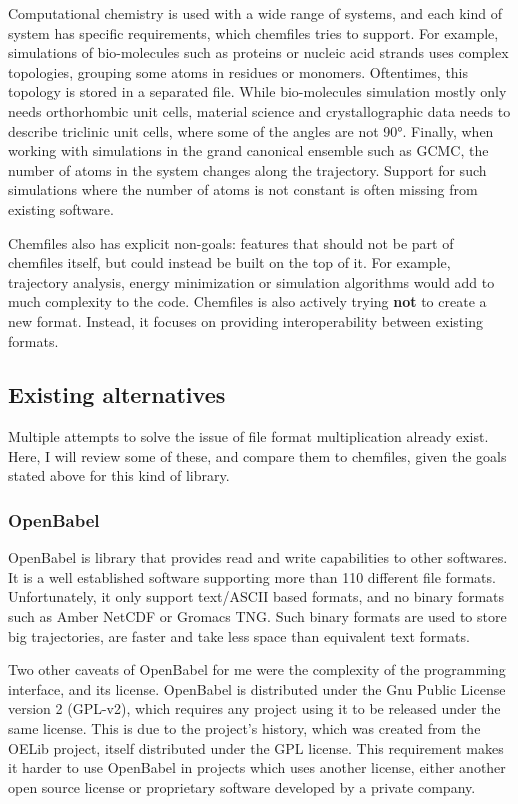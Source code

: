 \documentclass[thesis]{subfiles}
\begin{document}
Computational chemistry is used with a wide range of systems, and each kind of
system has specific requirements, which chemfiles tries to support. For
example, simulations of bio-molecules such as proteins or nucleic acid strands
uses complex topologies, grouping some atoms in residues or monomers.
Oftentimes, this topology is stored in a separated file. While bio-molecules
simulation mostly only needs orthorhombic unit cells, material science and
crystallographic data needs to describe triclinic unit cells, where some of the
angles are not 90°. Finally, when working with simulations in the grand
canonical ensemble such as GCMC, the number of atoms in the system changes along
the trajectory. Support for such simulations where the number of atoms is not
constant is often missing from existing software.

Chemfiles also has explicit non-goals: features that should not be part of
chemfiles itself, but could instead be built on the top of it. For example,
trajectory analysis, energy minimization or simulation algorithms would add to
much complexity to the code. Chemfiles is also actively trying \textbf{not} to
create a new format. Instead, it focuses on providing interoperability between
existing formats.

\subsection{Existing alternatives}

Multiple attempts to solve the issue of file format multiplication already
exist. Here, I will review some of these, and compare them to chemfiles,
given the goals stated above for this kind of library.

\subsubsection{OpenBabel}

OpenBabel\cite{OBoyle2011} is \cxx library that provides read and write
capabilities to other softwares. It is a well established software supporting
more than 110 different file formats. Unfortunately, it only support text/ASCII
based formats, and no binary formats such as Amber NetCDF or Gromacs TNG. Such
binary formats are used to store big trajectories, are faster and take less
space than equivalent text formats.

Two other caveats of OpenBabel for me were the complexity of the programming
interface, and its license. OpenBabel is distributed under the Gnu Public
License version 2 (GPL-v2), which requires any project using it to be released
under the same license. This is due to the project's history, which was created
from the OELib project, itself distributed under the GPL license. This
requirement makes it harder to use OpenBabel in projects which uses another
license, either another open source license or proprietary software developed by
a private company.
\end{document}
